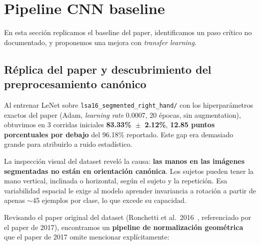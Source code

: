 \documentclass[a4paper,11pt]{article}
\begin{document}
\section{Pipeline CNN baseline}
\label{sec:cnn-pipeline}

En esta sección replicamos el baseline del paper, identificamos un paso crítico no documentado, y proponemos una mejora con \textit{transfer learning}.

\subsection{Réplica del paper y descubrimiento del preprocesamiento canónico}

Al entrenar LeNet sobre \texttt{lsa16\_segmented\_right\_hand/} con los hiperparámetros exactos del paper (Adam, \textit{learning rate} 0.0007, 20 épocas, sin augmentation), obtuvimos en 3 corridas iniciales \textbf{83.33\%~$\pm$~2.12\%}, \textbf{12.85 puntos porcentuales por debajo} del 96.18\% reportado. Este gap era demasiado grande para atribuirlo a ruido estadístico.

La inspección visual del dataset reveló la causa: \textbf{las manos en las imágenes segmentadas no están en orientación canónica}. Los sujetos pueden tener la mano vertical, inclinada o horizontal, según el sujeto y la repetición. Esa variabilidad espacial le exige al modelo aprender invariancia a rotación a partir de apenas $\sim$45 ejemplos por clase, lo que excede su capacidad.

Revisando el paper original del dataset (Ronchetti et al.\ 2016~\cite{ronchetti2016probsom}, referenciado por el paper de 2017), encontramos un \textbf{pipeline de normalización geométrica} que el paper de 2017 omite mencionar explícitamente:
\end{document}
